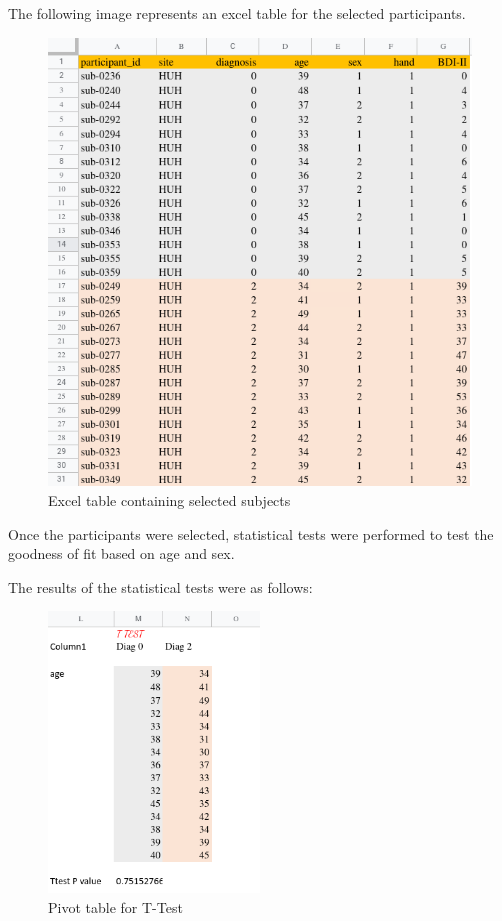 \documentclass[12pt]{article}
\begin{document}
The following image represents an excel table for the selected
participants.

\begin{figure}[H]
  \centering
  \includegraphics[width=\textwidth]{./.img/excel-subjects.png}
  \caption{Excel table containing selected subjects}%
  \label{fig:}
\end{figure}

Once the participants were selected, statistical tests were performed
to test the goodness of fit based on age and sex.

\newpage
The results of the statistical tests were as follows:

\begin{figure}[H]
  \centering
  \includegraphics[width=0.5\textwidth]{./.img/Excel-ttest.png}
  \caption{Pivot table for T-Test}%
  \label{fig:}
\end{figure}
\end{document}
